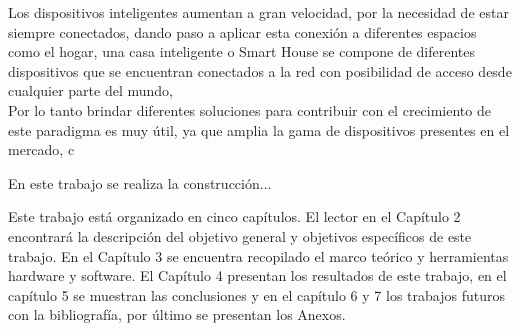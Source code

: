 Los dispositivos inteligentes aumentan a gran velocidad, por la necesidad de estar siempre conectados, dando paso a aplicar esta conexión a diferentes espacios como el hogar, una casa inteligente o Smart House se compone de diferentes dispositivos que se encuentran conectados a la red con posibilidad de acceso desde cualquier parte del mundo, \\

Por lo tanto brindar diferentes soluciones para contribuir con el crecimiento de este paradigma es muy útil, ya que amplia la gama de dispositivos presentes en el mercado, c

En este trabajo se realiza la construcción...

Este trabajo está organizado en cinco capítulos. El lector en el Capítulo 2 encontrará la descripción del
objetivo general y objetivos específicos de este trabajo. En el Capítulo 3 se encuentra recopilado el
marco teórico y herramientas hardware y software. El Capítulo 4 presentan los resultados de este trabajo,
en el capítulo 5 se muestran las conclusiones y en el capítulo 6 y 7 los trabajos futuros con la bibliografía,
por último se presentan los Anexos.